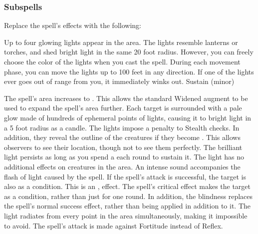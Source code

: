 \subsubsection{Subspells}
Replace the spell's effects with the following:
\begin{spellcontent}
\begin{augmenteffects}
\spelleffect
Up to four glowing lights appear in the area.
The lights resemble lanterns or torches, and shed bright light in the same 20 foot radius.
However, you can freely choose the color of the lights when you cast the spell.
During each movement phase, you can move the lights up to 100 feet in any direction.
If one of the lights ever goes out of range from you, it immediately winks out.
\spelldur Sustain (minor)
\end{augmenteffects}
\end{spellcontent}
The spell's area increases to \areasmall.
This allows the standard Widened augment to be used to expand the spell's area further.
Each target is surrounded with a pale glow made of hundreds of ephemeral points of lights, causing it to bright light in a 5 foot radius as a candle.
The lights impose a  penalty to Stealth checks.
In addition, they reveal the outline of the creatures if they become .
This allows observers to see their location, though not to see them perfectly.
The brilliant light persists as long as you spend a  each round to sustain it.
The light has no additional effects on creatures in the area.
An intense sound accompanies the flash of light caused by the spell.
If the spell's attack is successful, the target is also \deafened as a condition.
This is an ,  effect.
The spell's critical effect makes the target \blinded as a condition, rather than just for one round.
In addition, the blindness replaces the spell's normal success effect, rather than being applied in addition to it.
The light radiates from every point in the area simultaneously, making it impossible to avoid.
The spell's attack is made against Fortitude instead of Reflex.
